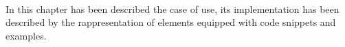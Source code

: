 \paragraph{}
In this chapter has been described the case of use, its implementation has been described by the rappresentation of elements equipped with code snippets and examples.